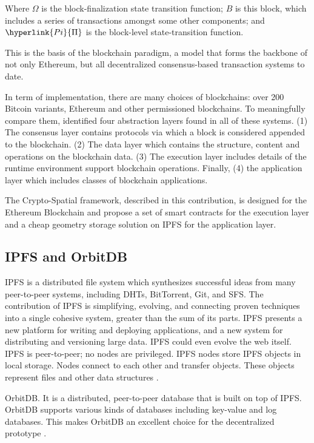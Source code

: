 \documentclass{isprs} %
\begin{document}
Where \hyperlink{Omega}{$\Omega$} is the block-finalization state transition function; \hyperlink{block}{$B$} is this block, which includes a series of transactions amongst some other components; and $\hyperlink{Pi}{\Pi}$ is the block-level state-transition function.

This is the basis of the blockchain paradigm, a model that forms the backbone of not only Ethereum, but all decentralized consensus-based transaction systems to date.

In term of implementation, there are many choices of blockchains: over 200 Bitcoin variants, Ethereum and other permissioned blockchains. To meaningfully compare them, \cite{dinh2017blockbench} identified four abstraction layers found in all of these systems. (1) The consensus layer contains protocols via which a block is considered appended to the blockchain. (2) The data layer which contains the structure, content and operations on the blockchain data. (3) The execution layer includes details of the runtime environment support blockchain operations. Finally, (4) the application layer which includes classes of blockchain applications. 

The Crypto-Spatial framework, described in this contribution, is designed for the Ethereum Blockchain and propose a set of smart contracts for the execution layer and a cheap geometry storage solution on IPFS for the application layer.

\subsection{IPFS and OrbitDB}\label{sec:IPFS and OrbitDB}

IPFS is a distributed file system which synthesizes successful ideas from many peer-to-peer systems, including DHTs, BitTorrent, Git, and SFS. The contribution of IPFS is simplifying, evolving, and connecting proven techniques into a single cohesive system, greater than the sum of its parts. IPFS presents a new platform for writing and deploying applications, and a new system for distributing and versioning large data. IPFS could even evolve the web itself. IPFS is peer-to-peer; no nodes are privileged. IPFS nodes store IPFS objects in local storage. Nodes connect to each other and transfer objects. These objects represent files and other data structures \cite{benet2014ipfs}.

OrbitDB. It is a distributed, peer-to-peer database that is built on top of IPFS. OrbitDB supports various kinds of databases including key-value and log databases. This makes OrbitDB an excellent choice for the decentralized prototype  \cite{orbitdb}. 
\end{document}
